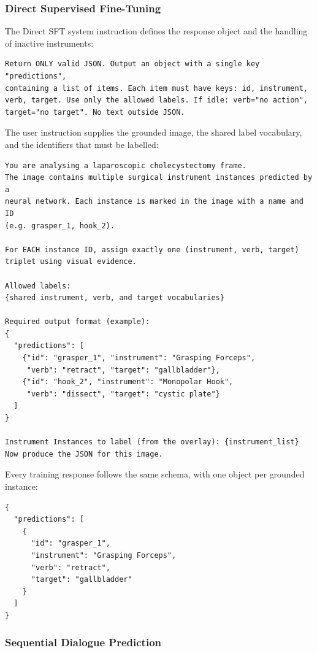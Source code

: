 \subsubsection{Direct Supervised Fine-Tuning}

The Direct SFT system instruction defines the response object and the handling of inactive instruments:

\begin{lstlisting}[style=c5prompt]
Return ONLY valid JSON. Output an object with a single key "predictions",
containing a list of items. Each item must have keys: id, instrument,
verb, target. Use only the allowed labels. If idle: verb="no action",
target="no target". No text outside JSON.
\end{lstlisting}

The user instruction supplies the grounded image, the shared label vocabulary, and the identifiers that must be labelled:

\begin{lstlisting}[style=c5prompt]
You are analysing a laparoscopic cholecystectomy frame.
The image contains multiple surgical instrument instances predicted by a
neural network. Each instance is marked in the image with a name and ID
(e.g. grasper_1, hook_2).

For EACH instance ID, assign exactly one (instrument, verb, target)
triplet using visual evidence.

Allowed labels:
{shared instrument, verb, and target vocabularies}

Required output format (example):
{
  "predictions": [
    {"id": "grasper_1", "instrument": "Grasping Forceps",
     "verb": "retract", "target": "gallbladder"},
    {"id": "hook_2", "instrument": "Monopolar Hook",
     "verb": "dissect", "target": "cystic plate"}
  ]
}

Instrument Instances to label (from the overlay): {instrument_list}
Now produce the JSON for this image.
\end{lstlisting}

Every training response follows the same schema, with one object per grounded instance:

\begin{lstlisting}[style=c5prompt]
{
  "predictions": [
    {
      "id": "grasper_1",
      "instrument": "Grasping Forceps",
      "verb": "retract",
      "target": "gallbladder"
    }
  ]
}
\end{lstlisting}

\subsubsection{Sequential Dialogue Prediction}

